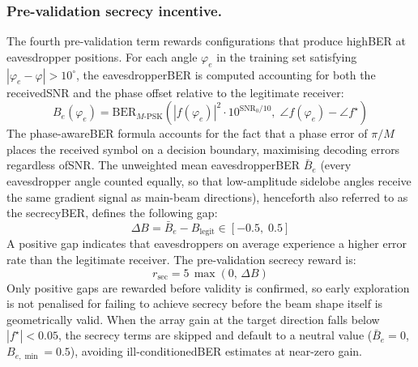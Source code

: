 \subsubsection{Pre-validation secrecy incentive.}
The fourth pre-validation term rewards configurations that produce high\gls{BER} at eavesdropper positions. For each angle $\varphi_e$ in the training set satisfying $|\varphi_e - \varphi| > 10^\circ$, the eavesdropper\gls{BER} is computed accounting for both the received\gls{SNR} and the phase offset relative to the legitimate receiver:
\begin{equation}
    B_e(\varphi_e) = \mathrm{BER}_{M\text{-PSK}}\!\left(|f(\varphi_e)|^2 \cdot 10^{\mathrm{SNR}_0/10},\; \angle f(\varphi_e) - \angle f^\star\right)
\end{equation}
The phase-aware\gls{BER} formula accounts for the fact that a phase error of $\pi/M$ places the received symbol on a decision boundary, maximising decoding errors regardless of\gls{SNR}. The unweighted mean eavesdropper\gls{BER} $\bar{B}_e$ (every eavesdropper angle counted equally, so that low-amplitude sidelobe angles receive the same gradient signal as main-beam directions), henceforth also referred to as the secrecy\gls{BER}, defines the following gap:
\begin{equation}
    \Delta B = \bar{B}_e - B_{\text{legit}} \in [-0.5,\; 0.5]
\end{equation}
A positive gap indicates that eavesdroppers on average experience a higher error rate than the legitimate receiver. The pre-validation secrecy reward is:
\begin{equation}
    r_{\text{sec}} = 5\,\max(0,\, \Delta B)
\end{equation}
Only positive gaps are rewarded before validity is confirmed, so early exploration is not penalised for failing to achieve secrecy before the beam shape itself is geometrically valid. When the array gain at the target direction falls below $|f^\star| < 0.05$, the secrecy terms are skipped and default to a neutral value ($\bar{B}_e = 0$, $B_{e,\min} = 0.5$), avoiding ill-conditioned\gls{BER} estimates at near-zero gain.

